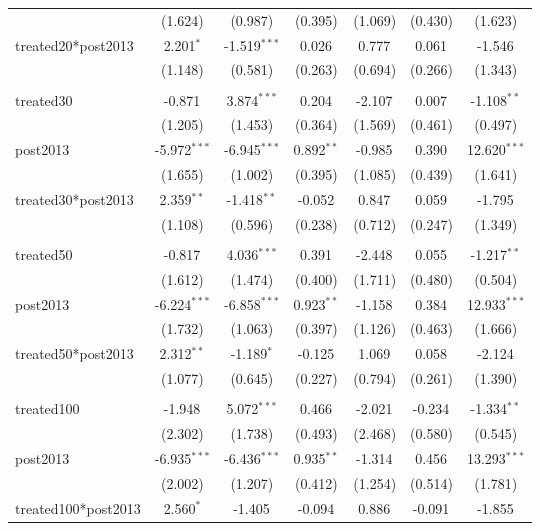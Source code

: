 \documentclass[12pt]{article}
\begin{document}
\begin{table}[!htbp]
\begin{tabular}{@{\extracolsep{5pt}}lcccccc}
  & (1.624) & (0.987) & (0.395) & (1.069) & (0.430) & (1.623) \\
 treated20*post2013 & 2.201$^{*}$ & -1.519$^{***}$ & 0.026$^{}$ & 0.777$^{}$ & 0.061$^{}$ & -1.546$^{}$ \\
  & (1.148) & (0.581) & (0.263) & (0.694) & (0.266) & (1.343) \\
\hline \\[-1.8ex]
 treated30 & -0.871$^{}$ & 3.874$^{***}$ & 0.204$^{}$ & -2.107$^{}$ & 0.007$^{}$ & -1.108$^{**}$ \\
  & (1.205) & (1.453) & (0.364) & (1.569) & (0.461) & (0.497) \\
 post2013 & -5.972$^{***}$ & -6.945$^{***}$ & 0.892$^{**}$ & -0.985$^{}$ & 0.390$^{}$ & 12.620$^{***}$ \\
  & (1.655) & (1.002) & (0.395) & (1.085) & (0.439) & (1.641) \\
 treated30*post2013 & 2.359$^{**}$ & -1.418$^{**}$ & -0.052$^{}$ & 0.847$^{}$ & 0.059$^{}$ & -1.795$^{}$ \\
  & (1.108) & (0.596) & (0.238) & (0.712) & (0.247) & (1.349) \\
\hline \\[-1.8ex]
 treated50 & -0.817$^{}$ & 4.036$^{***}$ & 0.391$^{}$ & -2.448$^{}$ & 0.055$^{}$ & -1.217$^{**}$ \\
  & (1.612) & (1.474) & (0.400) & (1.711) & (0.480) & (0.504) \\
 post2013 & -6.224$^{***}$ & -6.858$^{***}$ & 0.923$^{**}$ & -1.158$^{}$ & 0.384$^{}$ & 12.933$^{***}$ \\
  & (1.732) & (1.063) & (0.397) & (1.126) & (0.463) & (1.666) \\
 treated50*post2013 & 2.312$^{**}$ & -1.189$^{*}$ & -0.125$^{}$ & 1.069$^{}$ & 0.058$^{}$ & -2.124$^{}$ \\
  & (1.077) & (0.645) & (0.227) & (0.794) & (0.261) & (1.390) \\
\hline \\[-1.8ex]
 treated100 & -1.948$^{}$ & 5.072$^{***}$ & 0.466$^{}$ & -2.021$^{}$ & -0.234$^{}$ & -1.334$^{**}$ \\
  & (2.302) & (1.738) & (0.493) & (2.468) & (0.580) & (0.545) \\
 post2013 & -6.935$^{***}$ & -6.436$^{***}$ & 0.935$^{**}$ & -1.314$^{}$ & 0.456$^{}$ & 13.293$^{***}$ \\
  & (2.002) & (1.207) & (0.412) & (1.254) & (0.514) & (1.781) \\
 treated100*post2013 & 2.560$^{*}$ & -1.405$^{}$ & -0.094$^{}$ & 0.886$^{}$ & -0.091$^{}$ & -1.855$^{}$ \\

\end{tabular}
\end{table}
\end{document}
